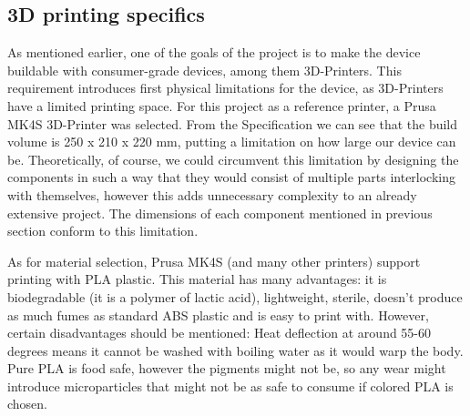 \subsection{3D printing specifics}
As mentioned earlier, one of the goals of the project is to make the device buildable with consumer-grade devices, among them 3D-Printers. This requirement introduces first physical limitations for the device, as 3D-Printers have a limited printing space. For this project as a reference printer, a Prusa MK4S 3D-Printer \cite{PrusaMK4Specs} was selected. From the Specification we can see that the build volume is 250 x 210 x 220 mm, putting a limitation on how large our device can be. Theoretically, of course, we could circumvent this limitation by designing the components in such a way that they would consist of multiple parts interlocking with themselves, however this adds unnecessary complexity to an already extensive project. The dimensions of each component mentioned in previous section conform to this limitation.

As for material selection, Prusa MK4S (and many other printers) support printing with PLA plastic. This material has many advantages: it is biodegradable (it is a polymer of lactic acid), lightweight, sterile, doesn't produce as much fumes as standard ABS plastic and is easy to print with. However, certain disadvantages should be mentioned: Heat deflection at around 55-60 degrees means it cannot be washed with boiling water as it would warp the body. Pure PLA is food safe, however the pigments might not be, so any wear might introduce microparticles that might not be as safe to consume if colored PLA is chosen.
